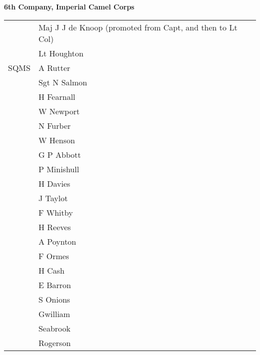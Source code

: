 \begin{center}
  \Large
  \textbf{6th Company, Imperial Camel Corps}
\end{center}

\begin{center}
  \begin{tabular}{rl}
    & Maj J J de Knoop (promoted from Capt, and then to Lt Col) \\
    & Lt Houghton \\
    SQMS & A Rutter \\
    & Sgt N Salmon \\
    & H Fearnall \\
    & W Newport \\
    & N Furber \\
    & W Henson \\
    & G P Abbott \\
    & P Minishull \\
    & H Davies \\
    & J Taylot \\
    & F Whitby \\
    & H Reeves \\
    & A Poynton \\
    & F Ormes \\
    & H Cash \\
    & E Barron \\
    & S Onions \\
    & Gwilliam \\
    & Seabrook \\
    & Rogerson \\
  \end{tabular}
\end{center}
